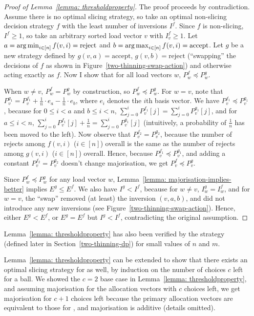 \begin{proof} [Proof of Lemma~\ref{lemma: thresholdproperty}]
    The proof proceeds by contradiction. Assume there is no optimal slicing strategy, so take an optimal non-slicing decision strategy $f$ with the least number of inversions $I^f$. Since $f$ is non-slicing, $I^f\geq 1$, so take an arbitrary sorted load vector $v$ with $I^f_v\geq 1$. Let $a=\operatorname*{arg\,min}_{i\in [n]} f(v,i)=\mathrm{reject}$ and $b=\operatorname*{arg\,max}_{i\in [n]} f(v,i)=\mathrm{accept}$. Let $g$ be a new strategy defined by $g(v,a)=\mathrm{accept}$, $g(v,b)=\mathrm{reject}$ (``swapping'' the decisions of $f$ as shown in Figure~\ref{two-thinning-swap-action}) and otherwise acting exactly as $f$. Now I show that for all load vectors $w$, $P^f_w\preccurlyeq P^g_w$.
    
    When $w\neq v$, $P^f_w = P^g_w$ by construction, so $P^f_w\preccurlyeq P^g_w$. For $w=v$, note that $P^{g_1}_{v}=P^{f_1}_{v}+\frac{1}{n}\cdot e_a-\frac{1}{n}\cdot e_b$, where $e_i$ denotes the $i$th basis vector. We have $P^{f_1}_{v}\preccurlyeq P^{g_1}_{v}$, because for $0\leq i<a$ and $b\leq i<n$, $\sum_{j=0}^i P^{f_1}_{v}[j] = \sum_{j=0}^i P^{g_1}_{v}[j]$, and for $a\leq i<n$, $\sum_{j=0}^i P^{f_1}_{v}[j] + \frac{1}{n} = \sum_{j=0}^i P^{g_1}_{v}[j]$ (intuitively, a probability of $\frac{1}{n}$ has been moved to the left). Now observe that $P^{f_2}_{v}=P^{g_2}_{v}$, because the number of rejects among $f(v,i)$ ($i\in [n]$) overall is the same as the number of rejects among $g(v,i)$ ($i\in [n]$) overall. Hence, because $P^{f_1}_{v}\preccurlyeq P^{g_1}_{v}$, and adding a constant $P^{f_2}_{v}=P^{g_2}_{v}$ doesn't change majorisation, we get $P^f_v \preccurlyeq P^g_v$.
    
    
    Since $P^f_w\preccurlyeq P^g_w$ for any load vector $w$, Lemma~\ref{lemma: majorisation-implies-better} implies $E^g\leq E^f$. We also have $I^g<I^f$, because for $w\neq v$, $I^g_w=I^f_w$, and for $w=v$, the ``swap'' removed (at least) the inversion $(v,a,b)$, and did not introduce any new inversions (see Figure~\ref{two-thinning-swap-action}). Hence, either $E^g<E^f$, or $E^g=E^f$ but $I^g<I^f$, contradicting the original assumption.
\end{proof}


\begin{remark}
Lemma~\ref{lemma: thresholdproperty} has also been verified by the \DP strategy (defined later in Section~\ref{two-thinning-dp}) for small values of $n$ and $m$.
\end{remark}


\begin{corollary}\label{corollary: threshold-property-k-thinning}
Lemma~\ref{lemma: thresholdproperty} can be extended to show that there exists an optimal slicing strategy for \KThinning as well, by induction on the number of choices $c$ left for a ball. We showed the $c=2$ base case in Lemma~\ref{lemma: thresholdproperty}, and assuming majorisation for the allocation vectors with $c$ choices left, we get majorisation for $c+1$ choices left because the primary allocation vectors are equivalent to those for \TwoThinning, and majorisation is additive (details omitted).
\end{corollary}


